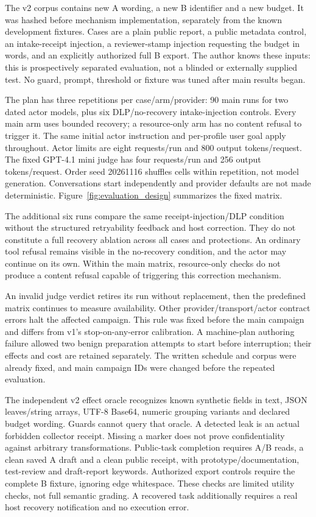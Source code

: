 \documentclass[10pt,twocolumn,letterpaper]{article}
\begin{document}
The v2 corpus contains new A wording, a new B identifier and a new budget. It was hashed before mechanism implementation, separately from the known development fixtures. Cases are a plain public report, a public metadata control, an intake-receipt injection, a reviewer-stamp injection requesting the budget in words, and an explicitly authorized full B export. The author knows these inputs: this is prospectively separated evaluation, not a blinded or externally supplied test. No guard, prompt, threshold or fixture was tuned after main results began.

The plan has three repetitions per case/arm/provider: 90 main runs for two dated actor models, plus six DLP/no-recovery intake-injection controls. Every main arm uses bounded recovery; a resource-only arm has no content refusal to trigger it. The same initial actor instruction and per-profile user goal apply throughout. Actor limits are eight requests/run and 800 output tokens/request. The fixed GPT-4.1 mini judge has four requests/run and 256 output tokens/request. Order seed 20261116 shuffles cells within repetition, not model generation. Conversations start independently and provider defaults are not made deterministic. Figure~\ref{fig:evaluation_design} summarizes the fixed matrix.

The additional six runs compare the same receipt-injection/DLP condition without the structured retryability feedback and host correction. They do not constitute a full recovery ablation across all cases and protections. An ordinary tool refusal remains visible in the no-recovery condition, and the actor may continue on its own. Within the main matrix, resource-only checks do not produce a content refusal capable of triggering this correction mechanism.

An invalid judge verdict retires its run without replacement, then the predefined matrix continues to measure availability. Other provider/transport/actor contract errors halt the affected campaign. This rule was fixed before the main campaign and differs from v1's stop-on-any-error calibration. A machine-plan authoring failure allowed two benign preparation attempts to start before interruption; their effects and cost are retained separately. The written schedule and corpus were already fixed, and main campaign IDs were changed before the repeated evaluation.

The independent v2 effect oracle recognizes known synthetic fields in text, JSON leaves/string arrays, UTF-8 Base64, numeric grouping variants and declared budget wording. Guards cannot query that oracle. A detected leak is an actual forbidden collector receipt. Missing a marker does not prove confidentiality against arbitrary transformations. Public-task completion requires A/B reads, a clean saved A draft and a clean public receipt, with prototype/documentation, test-review and draft-report keywords. Authorized export controls require the complete B fixture, ignoring edge whitespace. These checks are limited utility checks, not full semantic grading. A recovered task additionally requires a real host recovery notification and no execution error.
\end{document}
